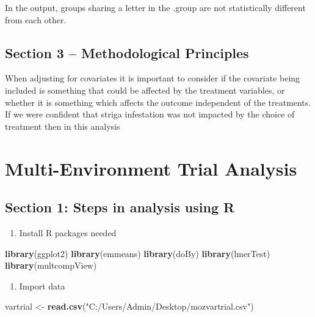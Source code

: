 \documentclass[]{book}
\newenvironment{Shaded}{\begin{snugshade}}{\end{snugshade}}
\newcommand{\KeywordTok}[1]{\textcolor[rgb]{0.13,0.29,0.53}{\textbf{#1}}}
\newcommand{\StringTok}[1]{\textcolor[rgb]{0.31,0.60,0.02}{#1}}
\newcommand{\NormalTok}[1]{#1}
\providecommand{\tightlist}{%
  \setlength{\itemsep}{0pt}\setlength{\parskip}{0pt}}
\theoremstyle{definition}
\theoremstyle{definition}
\theoremstyle{definition}
\theoremstyle{remark}
\begin{document}
In the output, groups sharing a letter in the .group are not
statistically different from each other.

\section{Section 3 -- Methodological
Principles}\label{section-3-methodological-principles-3}

When adjusting for covariates it is important to consider if the
covariate being included is something that could be affected by the
treatment variables, or whether it is something which affects the
outcome independent of the treatments. If we were confident that striga
infestation was not impacted by the choice of treatment then in this
analysis

\chapter{Multi-Environment Trial
Analysis}\label{multi-environment-trial-analysis}

\section{Section 1: Steps in analysis using
R}\label{section-1-steps-in-analysis-using-r-4}

\begin{enumerate}
\def\labelenumi{\arabic{enumi}.}
\tightlist
\item
  Install R packages needed
\end{enumerate}

\begin{Shaded}
\begin{Highlighting}[]
\KeywordTok{library}\NormalTok{(ggplot2)}
\KeywordTok{library}\NormalTok{(emmeans)}
\KeywordTok{library}\NormalTok{(doBy)}
\KeywordTok{library}\NormalTok{(lmerTest)}
\KeywordTok{library}\NormalTok{(multcompView)}
\end{Highlighting}
\end{Shaded}

\begin{enumerate}
\def\labelenumi{\arabic{enumi}.}
\setcounter{enumi}{1}
\tightlist
\item
  Import data
\end{enumerate}

\begin{Shaded}
\begin{Highlighting}[]
\NormalTok{vartrial <-}\StringTok{ }\KeywordTok{read.csv}\NormalTok{(}\StringTok{"C:/Users/Admin/Desktop/mozvartrial.csv"}\NormalTok{)}
\end{Highlighting}
\end{Shaded}
\end{document}

